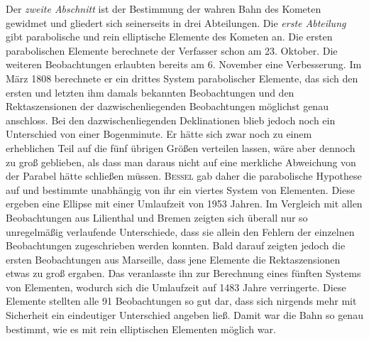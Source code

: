 Der \emph{zweite Abschnitt} ist der Bestimmung der wahren Bahn des Kometen gewidmet und gliedert sich seinerseits in drei Abteilungen. Die \emph{erste Abteilung} gibt parabolische und rein elliptische Elemente des Kometen an. Die ersten parabolischen Elemente berechnete der Verfasser schon am 23. Oktober. Die weiteren Beobachtungen erlaubten bereits am 6. November eine Verbesserung. Im März 1808 berechnete er ein drittes System parabolischer Elemente, das sich den ersten und letzten ihm damals bekannten Beobachtungen und den Rektaszensionen der dazwischenliegenden Beobachtungen möglichst genau anschloss. Bei den dazwischenliegenden Deklinationen blieb jedoch noch ein Unterschied von einer Bogenminute. Er hätte sich zwar noch zu einem erheblichen Teil auf die fünf übrigen Größen verteilen lassen, wäre aber dennoch zu groß geblieben, als dass man daraus nicht auf eine merkliche Abweichung von der Parabel hätte schließen müssen. \textsc{Bessel} gab daher die parabolische Hypothese auf und bestimmte unabhängig von ihr ein viertes System von Elementen. Diese ergeben eine Ellipse mit einer Umlaufzeit von 1953 Jahren. Im Vergleich mit allen Beobachtungen aus Lilienthal und Bremen zeigten sich überall nur so unregelmäßig verlaufende Unterschiede, dass sie allein den Fehlern der einzelnen Beobachtungen zugeschrieben werden konnten. Bald darauf zeigten jedoch die ersten Beobachtungen aus Marseille, dass jene Elemente die Rektaszensionen etwas zu groß ergaben. Das veranlasste ihn zur Berechnung eines fünften Systems von Elementen, wodurch sich die Umlaufzeit auf 1483 Jahre verringerte. Diese Elemente stellten alle 91 Beobachtungen so gut dar, dass sich nirgends mehr mit Sicherheit ein eindeutiger Unterschied angeben ließ. Damit war die Bahn so genau bestimmt, wie es mit rein elliptischen Elementen möglich war.


